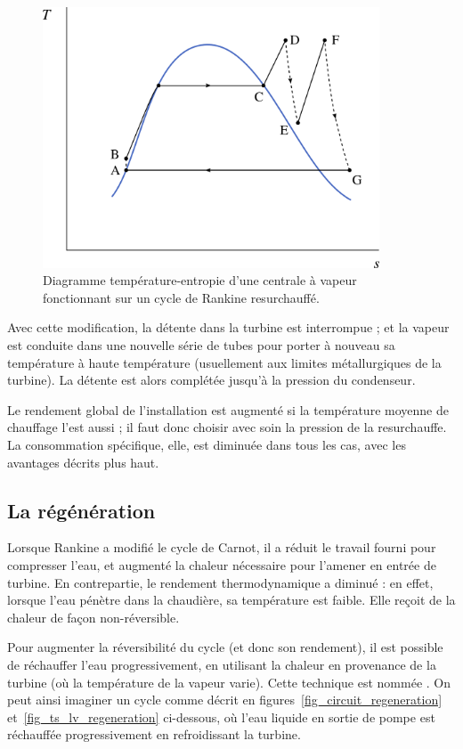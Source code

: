 		\begin{figure}
			\begin{center}
				\includegraphics[width=10cm]{images/ts_lv_rankine_surchauffe_resurchauffe.png}
			\end{center}
			\caption{Diagramme température-entropie d’une centrale à vapeur fonctionnant sur un cycle de Rankine resurchauffé.}
			\label{fig_ts_lv_surchauffe_resurchauffe}
		\end{figure}

		Avec cette modification, la détente dans la turbine est interrompue ; et la vapeur est conduite dans une nouvelle série de tubes pour porter à nouveau sa température à haute température (usuellement aux limites métallurgiques de la turbine). La détente est alors complétée jusqu’à la pression du condenseur.

		Le rendement global de l’installation est augmenté si la température moyenne de chauffage l’est aussi ; il faut donc choisir avec soin la pression de la resurchauffe. La consommation spécifique, elle, est diminuée dans tous les cas, avec les avantages décrits plus haut.



	\subsection{La régénération}

		Lorsque Rankine a modifié le cycle de Carnot, il a réduit le travail fourni pour compresser l’eau, et augmenté la chaleur nécessaire pour l’amener en entrée de turbine. En contrepartie, le rendement thermodynamique a diminué : en effet, lorsque l’eau pénètre dans la chaudière, sa température est faible. Elle reçoit de la chaleur de façon non-réversible.

		Pour augmenter la réversibilité du cycle (et donc son rendement), il est possible de réchauffer l’eau progressivement, en utilisant la chaleur en provenance de la turbine (où la température de la vapeur varie). Cette technique est nommée . On peut ainsi imaginer un cycle comme décrit en figures~\ref{fig_circuit_regeneration} et~\ref{fig_ts_lv_regeneration} ci-dessous, où l’eau liquide en sortie de pompe est réchauffée progressivement en refroidissant la turbine.

